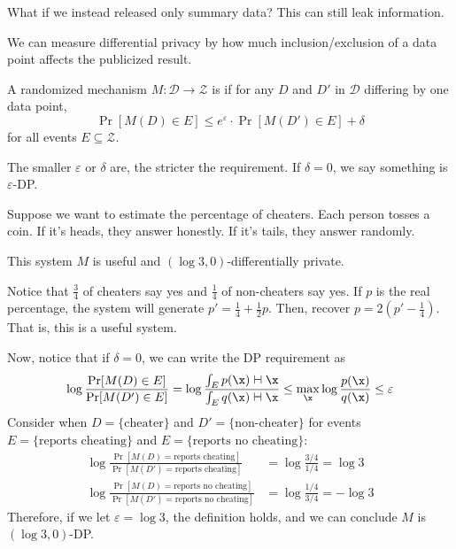 \documentclass[class=cs480,notes,tikz]{agony}
\begin{document}
What if we instead released only summary data?
This can still leak information.

We can measure differential privacy by how much inclusion/exclusion of a data point
affects the publicized result.

\begin{defn}
  A randomized mechanism $M : \mathcal{D} \to \mathcal{Z}$ is 
  if for any $D$ and $D'$ in $\mathcal{D}$ differing by one data point,
  \[ \Pr[M(D) \in E] \leq e^{\varepsilon} \cdot \Pr[M(D') \in E] + \delta \]
  for all events $E \subseteq \mathcal{Z}$.
\end{defn}

The smaller $\varepsilon$ or $\delta$ are, the stricter the requirement.
If $\delta = 0$, we say something is $\varepsilon$-DP.

\begin{example}
  Suppose we want to estimate the percentage of cheaters.
  Each person tosses a coin.
  If it's heads, they answer honestly.
  If it's tails, they answer randomly.

  This system $M$ is useful and $(\log 3,0)$-differentially private.
\end{example}
\begin{prf}
  Notice that $\frac34$ of cheaters say yes and $\frac14$ of non-cheaters say yes.
  If $p$ is the real percentage, the system will generate $p' = \frac14+\frac12p$.
  Then, recover $p = 2(p'-\frac14)$.
  That is, this is a useful system.

  Now, notice that if $\delta = 0$, we can write the DP requirement as
  \[
    \log\frac{\Pr[M(D) \in E]}{\Pr[M(D') \in E]} = \log \frac{\int_E p(\x)\dd{\x}}{\int_E q(\x)\dd{\x}}
    \leq \max_{\x}\log\frac{p(\x)}{q(\x)} \leq \varepsilon
  \]
  Consider when $D = \{\text{cheater}\}$ and $D' = \{\text{non-cheater}\}$
  for events $E = \{\text{reports cheating}\}$ and $E = \{\text{reports no cheating}\}$:
  \begin{align*}
    \log\frac{\Pr[M(D) = \text{reports cheating}]}{\Pr[M(D') = \text{reports cheating}]}       & = \log\frac{3/4}{1/4} = \log 3  \\
    \log\frac{\Pr[M(D) = \text{reports no cheating}]}{\Pr[M(D') = \text{reports no cheating}]} & = \log\frac{1/4}{3/4} = -\log 3
  \end{align*}
  Therefore, if we let $\varepsilon = \log 3$, the definition holds,
  and we can conclude $M$ is $(\log 3,0)$-DP.
\end{prf}
\end{document}

